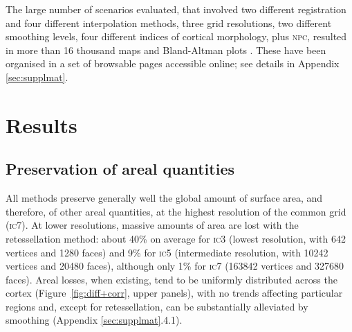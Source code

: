 The large number of scenarios evaluated, that involved two different registration and four different interpolation methods, three grid resolutions, two different smoothing levels, four different indices of cortical morphology, plus \textsc{npc}, resulted in more than 16 thousand maps and Bland-Altman plots \citep{Bland1986}. These have been organised in a set of browsable pages accessible online; see details in Appendix \ref{sec:supplmat}.

\section{Results}
\label{sec:cortex:results}

\subsection{Preservation of areal quantities}

All methods preserve generally well the global amount of surface area, and therefore, of other areal quantities, at the highest resolution of the common grid (\textsc{ic}7). At lower resolutions, massive amounts of area are lost with the retessellation method: about 40\% on average for \textsc{ic}3 (lowest resolution, with 642 vertices and 1280 faces) and 9\% for \textsc{ic}5 (intermediate resolution, with 10242 vertices and 20480 faces), although only 1\% for \textsc{ic}7 (163842 vertices and 327680 faces). Areal losses, when existing, tend to be uniformly distributed across the cortex (Figure~\ref{fig:diff+corr}, upper panels), with no trends affecting particular regions and, except for retessellation, can be substantially alleviated by smoothing (Appendix \ref{sec:supplmat}.4.1). %

\begin{figure}[!p]
\end{figure}


